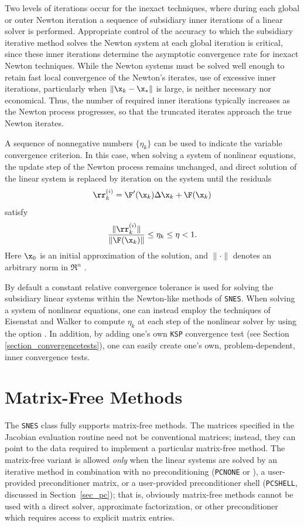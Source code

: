 Two levels of iterations occur for the inexact techniques, where
during each global or outer Newton iteration a sequence of
subsidiary inner iterations of a linear solver is performed.
Appropriate control of the accuracy to which the subsidiary
iterative method solves the Newton system
at each global iteration is critical, since these
inner iterations determine the asymptotic convergence rate for
inexact Newton techniques.
While the Newton systems must be solved well enough to retain
fast local convergence of the Newton's iterates, use of excessive
inner iterations, particularly when $ \| \x_k - \x_* \| $ is large,
is neither necessary nor economical.
Thus, the number of required inner iterations typically increases
as the Newton process progresses, so that the truncated iterates
approach the true Newton iterates.

A sequence of nonnegative numbers $ \{\eta_k\} $ can be used to
indicate the variable convergence criterion.
In this case, when solving a system of nonlinear equations, the
update step of the Newton process remains unchanged, and direct
solution of the linear system is replaced by iteration on the
system until the residuals
\[  \rr_k^{(i)} =  \F'(\x_k) \Delta \x_k + \F(\x_k) \]
satisfy
\[  \frac{ \| \rr_k^{(i)} \| }{ \| \F(\x_k) \| } \leq \eta_k \leq \eta < 1. \]
Here $ \x_0 $ is an initial approximation of the solution, and
$ \| \cdot \| $ denotes an arbitrary norm in $ \Re^n $ .

By default a constant relative convergence tolerance is used for
solving the subsidiary linear systems within the Newton-like methods
of \lstinline{SNES}.  When solving a system of nonlinear equations, one can
instead employ the techniques of Eisenstat and Walker \cite{EW96}
to compute $ \eta_k $ at each step of the nonlinear solver by using the
option  . In addition,
by adding one's own \lstinline{KSP} convergence test (see Section
\ref{section_convergencetests}), one can easily create one's own,
problem-dependent, inner convergence tests.

\section{Matrix-Free Methods}
\label{sec_nlmatrixfree}

The \lstinline{SNES} class fully supports matrix-free methods. The matrices specified in the
Jacobian evaluation routine need not be conventional
matrices; instead, they can point to the data required to implement a
particular matrix-free method.  The matrix-free variant is allowed
{\em only} when the linear systems are solved by an iterative method
in combination with no preconditioning (\lstinline{PCNONE} or  ),
a user-provided preconditioner matrix, or a user-provided preconditioner
shell (\lstinline{PCSHELL}, discussed in Section~\ref{sec_pc}); that is,
obviously matrix-free methods cannot be used with a direct solver, approximate factorization, or other preconditioner
which requires access to explicit matrix entries.

